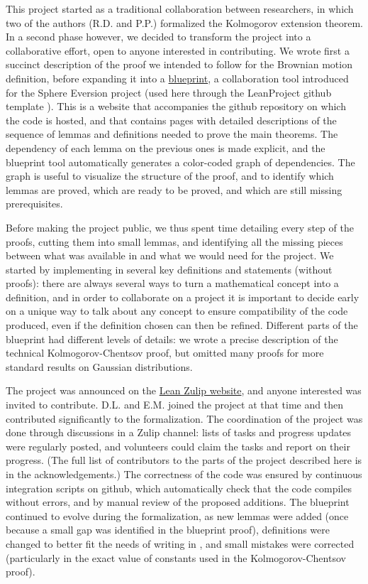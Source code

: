 \documentclass[lean]{Draft}
\begin{document}
This project started as a traditional collaboration between researchers, in which two of the authors (R.D. and P.P.) formalized the Kolmogorov extension theorem.
In a second phase however, we decided to transform the project into a collaborative effort, open to anyone interested in contributing.
We wrote first a succinct description of the proof we intended to follow for the Brownian motion definition, before expanding it into a \href{https://remydegenne.github.io/brownian-motion/blueprint/}{blueprint}, a collaboration tool introduced for the Sphere Eversion project \cite{sphere_eversion} (used here through the LeanProject github template \cite{Monticone_LeanProject_2025}).
This is a website that accompanies the github repository on which the code is hosted, and that contains pages with detailed descriptions of the sequence of lemmas and definitions needed to prove the main theorems.
The dependency of each lemma on the previous ones is made explicit, and the blueprint tool automatically generates a color-coded graph of dependencies.
The graph is useful to visualize the structure of the proof, and to identify which lemmas are proved, which are ready to be proved, and which are still missing prerequisites.

Before making the project public, we thus spent time detailing every step of the proofs, cutting them into small lemmas, and identifying all the missing pieces between what was available in \mathlib and what we would need for the project.
We started by implementing in \Lean several key definitions and statements (without proofs): there are always several ways to turn a mathematical concept into a \Lean definition, and in order to collaborate on a project it is important to decide early on a unique way to talk about any concept to ensure compatibility of the code produced, even if the definition chosen can then be refined.
Different parts of the blueprint had different levels of details: we wrote a precise description of the technical Kolmogorov-Chentsov proof, but omitted many proofs for more standard results on Gaussian distributions.

The project was announced on the \href{https://leanprover.zulipchat.com/}{Lean Zulip website}, and anyone interested was invited to contribute. D.L. and E.M. joined the project at that time and then contributed significantly to the formalization. The coordination of the project was done through discussions in a Zulip channel: lists of tasks and progress updates were regularly posted, and volunteers could claim the tasks and report on their progress. (The full list of contributors to the parts of the project described here is in the acknowledgements.)
The correctness of the code was ensured by continuous integration scripts on github, which automatically check that the code compiles without errors, and by manual review of the proposed additions.
The blueprint continued to evolve during the formalization, as new lemmas were added (once because a small gap was identified in the blueprint proof), definitions were changed to better fit the needs of writing in \Lean, and small mistakes were corrected (particularly in the exact value of constants used in the Kolmogorov-Chentsov proof).
\end{document}
